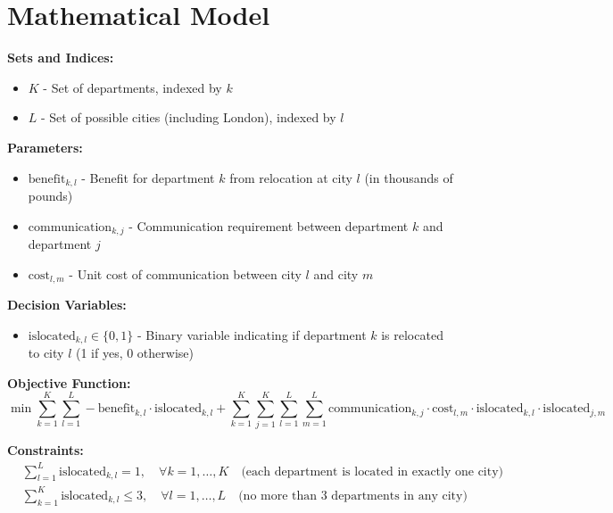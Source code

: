 \documentclass{article}
\begin{document}
\section*{Mathematical Model}

\textbf{Sets and Indices:}
\begin{itemize}
    \item \( K \) - Set of departments, indexed by \( k \)
    \item \( L \) - Set of possible cities (including London), indexed by \( l \)
\end{itemize}

\textbf{Parameters:}
\begin{itemize}
    \item \( \text{benefit}_{k, l} \) - Benefit for department \( k \) from relocation at city \( l \) (in thousands of pounds)
    \item \( \text{communication}_{k, j} \) - Communication requirement between department \( k \) and department \( j \)
    \item \( \text{cost}_{l, m} \) - Unit cost of communication between city \( l \) and city \( m \)
\end{itemize}

\textbf{Decision Variables:}
\begin{itemize}
    \item \( \text{islocated}_{k, l} \in \{0, 1\} \) - Binary variable indicating if department \( k \) is relocated to city \( l \) (1 if yes, 0 otherwise)
\end{itemize}

\textbf{Objective Function:}
\[
\min \sum_{k=1}^{K} \sum_{l=1}^{L} -\text{benefit}_{k, l} \cdot \text{islocated}_{k, l} + \sum_{k=1}^{K} \sum_{j=1}^{K} \sum_{l=1}^{L} \sum_{m=1}^{L} \text{communication}_{k, j} \cdot \text{cost}_{l, m} \cdot \text{islocated}_{k, l} \cdot \text{islocated}_{j, m}
\]

\textbf{Constraints:}
\begin{align}
    & \sum_{l=1}^{L} \text{islocated}_{k, l} = 1, \quad \forall k = 1, \ldots, K \quad \text{(each department is located in exactly one city)} \\
    & \sum_{k=1}^{K} \text{islocated}_{k, l} \leq 3, \quad \forall l = 1, \ldots, L \quad \text{(no more than 3 departments in any city)}
\end{align}
\end{document}
